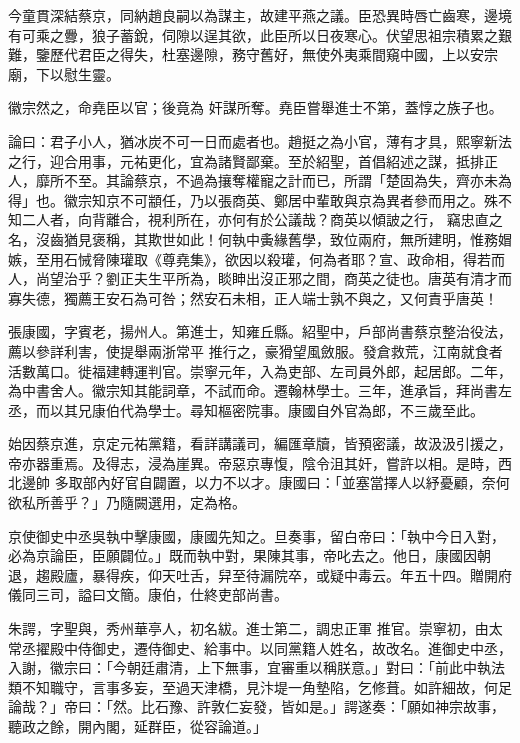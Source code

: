 \begin{pinyinscope}
 今童貫深結蔡京，同納趙良嗣以為謀主，故建平燕之議。臣恐異時唇亡齒寒，邊境有可乘之釁，狼子蓄銳，伺隙以逞其欲，此臣所以日夜寒心。伏望思祖宗積累之艱難，鑒歷代君臣之得失，杜塞邊隙，務守舊好，無使外夷乘間窺中國，上以安宗廟，下以慰生靈。



 徽宗然之，命堯臣以官；後竟為
 奸謀所奪。堯臣嘗舉進士不第，蓋惇之族子也。



 論曰：君子小人，猶冰炭不可一日而處者也。趙挺之為小官，薄有才具，熙寧新法之行，迎合用事，元祐更化，宜為諸賢鄙棄。至於紹聖，首倡紹述之謀，抵排正人，靡所不至。其論蔡京，不過為攘奪權寵之計而已，所謂「楚固為失，齊亦未為得」也。徽宗知京不可顓任，乃以張商英、鄭居中輩敢與京為異者參而用之。殊不知二人者，向背離合，視利所在，亦何有於公議哉？商英以傾詖之行，
 竊忠直之名，沒齒猶見褒稱，其欺世如此！何執中夤緣舊學，致位兩府，無所建明，惟務媢嫉，至用石悈脅陳瓘取《尊堯集》，欲因以殺瓘，何為者耶？宣、政命相，得若而人，尚望治乎？劉正夫生平所為，睒眒出沒正邪之間，商英之徒也。唐英有清才而寡失德，獨薦王安石為可咎；然安石未相，正人端士孰不與之，又何責乎唐英！



 張康國，字賓老，揚州人。第進士，知雍丘縣。紹聖中，戶部尚書蔡京整治役法，薦以參詳利害，使提舉兩浙常平
 推行之，豪猾望風斂服。發倉救荒，江南就食者活數萬口。徙福建轉運判官。崇寧元年，入為吏部、左司員外郎，起居郎。二年，為中書舍人。徽宗知其能詞章，不試而命。遷翰林學士。三年，進承旨，拜尚書左丞，而以其兄康伯代為學士。尋知樞密院事。康國自外官為郎，不三歲至此。



 始因蔡京進，京定元祐黨籍，看詳講議司，編匯章牘，皆預密議，故汲汲引援之，帝亦器重焉。及得志，浸為崖異。帝惡京專愎，陰令沮其奸，嘗許以相。是時，西北邊帥
 多取部內好官自闢置，以力不以才。康國曰：「並塞當擇人以紓憂顧，奈何欲私所善乎？」乃隨闕選用，定為格。



 京使御史中丞吳執中擊康國，康國先知之。旦奏事，留白帝曰：「執中今日入對，必為京論臣，臣願闢位。」既而執中對，果陳其事，帝叱去之。他日，康國因朝退，趨殿廬，暴得疾，仰天吐舌，舁至待漏院卒，或疑中毒云。年五十四。贈開府儀同三司，謚曰文簡。康伯，仕終吏部尚書。



 朱諤，字聖與，秀州華亭人，初名紱。進士第二，調忠正軍
 推官。崇寧初，由太常丞擢殿中侍御史，遷侍御史、給事中。以同黨籍人姓名，故改名。進御史中丞，入謝，徽宗曰：「今朝廷肅清，上下無事，宜審重以稱朕意。」對曰：「前此中執法類不知職守，言事多妄，至過天津橋，見汴堤一角墊陷，乞修葺。如許細故，何足論哉？」帝曰：「然。比石豫、許敦仁妄發，皆如是。」諤遂奏：「願如神宗故事，聽政之餘，開內閣，延群臣，從容論道。」




\end{pinyinscope}
